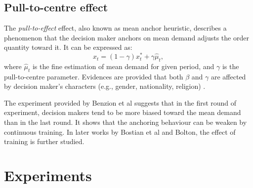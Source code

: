 \documentclass[a4paper,11pt]{article}
\begin{document}
\subsection{Pull-to-centre effect}
\label{sub:lit3}

The \emph{pull-to-effect} effect, also known as mean anchor heuristic, describes a phenomenon that the decision maker anchors on mean demand adjusts the order quantity toward it. It can be expressed as:
\[
    x_t = (1-\gamma) x_t^* + \gamma \hat{\mu}_t,
\]
where $\hat{\mu}_t$ is the fine estimation of mean demand for given period, and $\gamma$ is the pull-to-centre parameter. Evidences are provided that both $\beta$ and $\gamma$ are affected by decision maker's characters (e.g., gender, nationality, religion) \cite{FKZ11}.

The experiment provided by Benzion et al \cite{BCPS08} suggests that in the first round of experiment, decision makers tend to be more biased toward the mean demand than in the last round. It shows that the anchoring behaviour can be weaken by continuous training. In later works by Bostian et al \cite{BHS08} and Bolton\cite{BK08}, the effect of training is further studied.

\section{Experiments}
\label{se:exp}

\printbibliography
\end{document}
